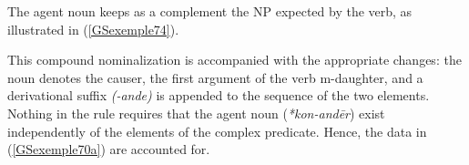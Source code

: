 \documentclass[output=paper]{langsci/langscibook}
\begin{document}
{\begin{exe}
\end{exe}

The agent noun keeps as a complement the NP expected by the verb, as illustrated in (\ref{GSexemple74}).   

\begin{exe}
	\label{GSexemple74}

\end{exe}

This compound nominalization is accompanied with the appropriate changes: the noun denotes the causer, the first argument of the verb m-daughter, and a derivational suffix \textit{(-ande)} is appended to the sequence of the two elements. Nothing in the rule requires that the agent noun (\textit{*kon-and\=er}) exist independently of the elements of the complex predicate. Hence, the data in (\ref{GSexemple70a}) are accounted for.

}
\end{document}

